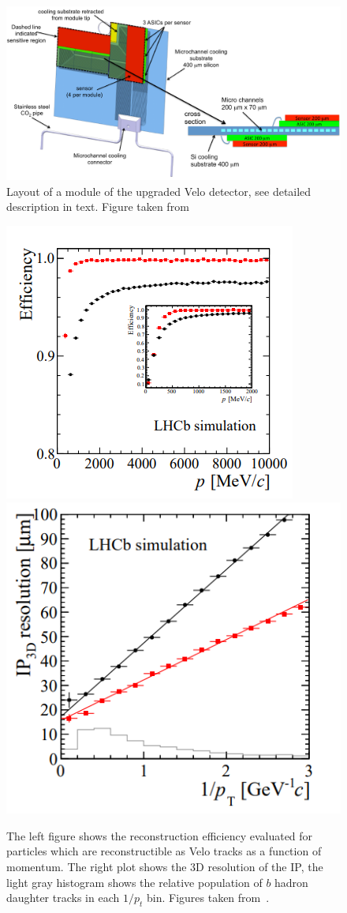 \begin{figure}[!h]
\centering
\includegraphics[width=\linewidth]{figures/Velo_upgraded_module.pdf}
\caption{Layout of a module of the upgraded Velo detector, see detailed description in text. Figure taken from~\cite{velo_upgrade_tdr}
\label{fig:veloUpgradeModule}}
\end{figure}




\begin{figure}[!h]
 \begin{center}
  \includegraphics[width=0.49\linewidth]{figures/Velo_upgrade_tracking.PNG}
   \includegraphics[width=0.49\linewidth]{figures/Velo_upgrade_IP.PNG}
    \caption{The left figure shows the reconstruction efficiency evaluated for particles which are reconstructible as Velo tracks as a function of momentum. The right plot shows the  3D resolution of the IP, the light gray histogram shows the relative population of $b$ hadron daughter tracks in each $1/p_t$ bin. Figures taken from~\cite{velo_upgrade_tdr}.}%
    \label{fig:upgrade_velo_performance}%
 \end{center}
\end{figure}

